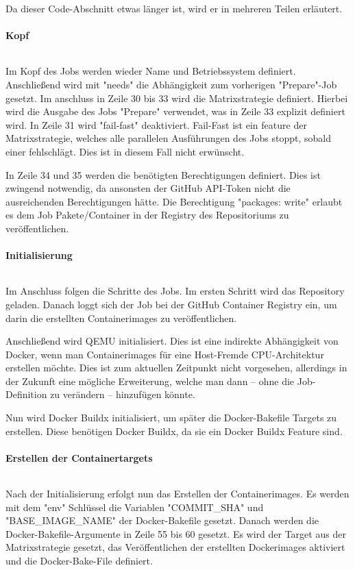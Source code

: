 Da dieser Code-Abschnitt etwas länger ist, wird er in mehreren Teilen erläutert.

\paragraph{Kopf}

\inputminted[firstline=25,lastline=35]{yaml}{./code-examples/containers-ci.yml}

Im Kopf des Jobs werden wieder Name und Betriebssystem definiert. Anschließend wird mit "needs" die Abhängigkeit zum vorherigen "Prepare"-Job gesetzt. Im anschluss in Zeile 30 bis 33 wird die Matrixstrategie definiert. Hierbei wird die Ausgabe des Jobs "Prepare" verwendet, was in Zeile 33 explizit definiert wird. In Zeile 31 wird "fail-fast" deaktiviert. Fail-Fast ist ein feature der Matrixstrategie, welches alle parallelen Ausführungen des Jobs stoppt, sobald einer fehlschlägt. Dies ist in diesem Fall nicht erwünscht.

In Zeile 34 und 35 werden die benötigten Berechtigungen definiert. Dies ist zwingend notwendig, da ansonsten der GitHub API-Token nicht die ausreichenden Berechtigungen hätte. Die Berechtigung "packages: write" erlaubt es dem Job Pakete/Container in der Registry des Repositoriums zu veröffentlichen.

\paragraph{Initialisierung}

\inputminted[firstline=36,lastline=49]{yaml}{./code-examples/containers-ci.yml}

Im Anschluss folgen die Schritte des Jobs. Im ersten Schritt wird das Repository geladen. Danach loggt sich der Job bei der GitHub Container Registry ein, um darin die erstellten Containerimages zu veröffentlichen. 

Anschließend wird QEMU initialisiert. Dies ist eine indirekte Abhängigkeit von Docker, wenn man Containerimages für eine Host-Fremde CPU-Architektur erstellen möchte. Dies ist zum aktuellen Zeitpunkt nicht vorgesehen, allerdings in der Zukunft eine mögliche Erweiterung, welche man dann – ohne die Job-Definition zu verändern – hinzufügen könnte.

Nun wird Docker Buildx initialisiert, um später die Docker-Bakefile Targets zu erstellen. Diese benötigen Docker Buildx, da sie ein Docker Buildx Feature sind. 

\paragraph{Erstellen der Containertargets}

\inputminted[firstline=50,lastline=60]{yaml}{./code-examples/containers-ci.yml}

Nach der Initialisierung erfolgt nun das Erstellen der Containerimages. Es werden mit dem "env" Schlüssel die Variablen "COMMIT\_SHA" und "BASE\_IMAGE\_NAME" der Docker-Bakefile gesetzt. Danach werden die Docker-Bakefile-Argumente in Zeile 55 bis 60 gesetzt. Es wird der Target aus der Matrixstrategie gesetzt, das Veröffentlichen der erstellten Dockerimages aktiviert und die Docker-Bake-File definiert.
